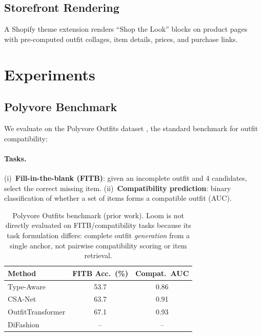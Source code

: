 \documentclass[10pt,twocolumn]{article}
\begin{document}
\subsection{Storefront Rendering}

A Shopify theme extension renders ``Shop the Look'' blocks on product pages
with pre-computed outfit collages, item details, prices, and purchase links.

\section{Experiments}
\label{sec:experiments}

\subsection{Polyvore Benchmark}

We evaluate on the Polyvore Outfits dataset \citep{vasileva2018learning},
the standard benchmark for outfit compatibility:

\paragraph{Tasks.}
(i)~\textbf{Fill-in-the-blank (FITB)}: given an incomplete outfit and 4
candidates, select the correct missing item.
(ii)~\textbf{Compatibility prediction}: binary classification of whether
a set of items forms a compatible outfit (AUC).

\begin{table}[h]
\centering
\small
\caption{Polyvore Outfits benchmark (prior work).  Loom is not directly
evaluated on FITB/compatibility tasks because its task formulation differs:
complete outfit \emph{generation} from a single anchor, not pairwise
compatibility scoring or item retrieval.}
\label{tab:polyvore}
\begin{tabular}{lcc}
\toprule
Method & FITB Acc.\ (\%) & Compat.\ AUC \\
\midrule
Type-Aware \citep{vasileva2018learning} & 53.7 & 0.86 \\
CSA-Net \citep{lin2020csanet} & 63.7 & 0.91 \\
OutfitTransformer \citep{sarkar2023outfittransformer} & 67.1 & 0.93 \\
DiFashion \citep{xu2024difashion} & -- & -- \\
\bottomrule
\end{tabular}
\end{table}
\end{document}
